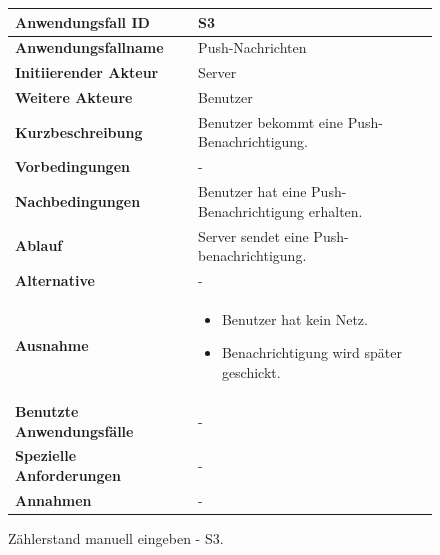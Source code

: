 \newpage

\begin{figure}[H]
	\centering
	\begin{tabularx}{\textwidth}{ X | X }
		\textbf{Anwendungsfall ID} & S3 \\ \hline
		\textbf{Anwendungsfallname} & Push-Nachrichten \\ \hline
		\textbf{Initiierender Akteur} & Server \\ \hline
		\textbf{Weitere Akteure} & Benutzer \\ \hline
		\textbf{Kurzbeschreibung} & Benutzer bekommt eine Push-Benachrichtigung. \\ \hline
		\textbf{Vorbedingungen} & - \\ \hline
		\textbf{Nachbedingungen} & Benutzer hat eine Push-Benachrichtigung erhalten. \\ \hline
		\textbf{Ablauf} & Server sendet eine Push-benachrichtigung. \\ \hline
		\textbf{Alternative} & - \\ \hline
		\textbf{Ausnahme} &
		\begin{itemize}
			\item Benutzer hat kein Netz.
			\item Benachrichtigung wird später geschickt.
		\end{itemize} \\ \hline
		\textbf{Benutzte Anwendungsfälle} & - \\ \hline
		\textbf{Spezielle Anforderungen} & - \\ \hline
		\textbf{Annahmen} & -
	\end{tabularx}
	\caption{Zählerstand manuell eingeben - S3.}
	\label{fig:anwendungsfall-server-tabelle-xx-1}
\end{figure}
